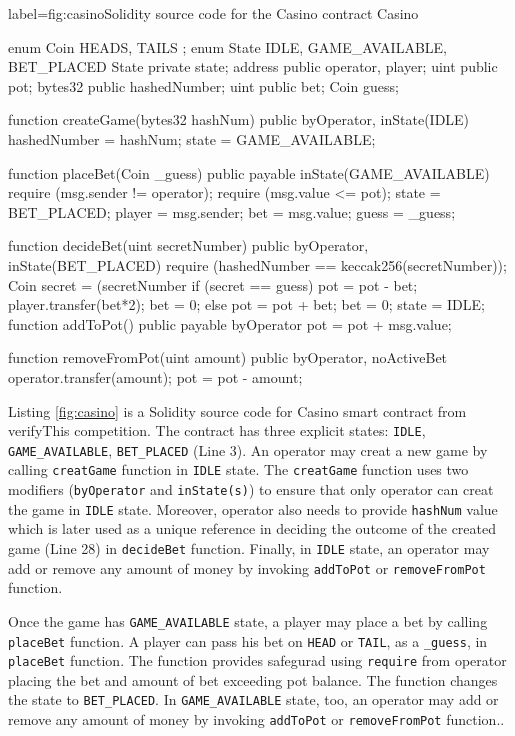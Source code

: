 \documentclass[a4paper,UKenglish,cleveref, autoref, thm-restate]{oasics-v2021}
\begin{document}
\begin{solidity}{label={fig:casino}}{Solidity source code for the Casino}
	contract Casino {
		enum Coin { HEADS, TAILS } ;
		enum State { IDLE, GAME_AVAILABLE,  BET_PLACED }
		State private state; 
		address public operator, player;
		uint public pot;
		bytes32 public hashedNumber;
		uint public bet;
		Coin guess;

		function createGame(bytes32 hashNum) 
		public byOperator, inState(IDLE) { 
		hashedNumber = hashNum; 
		state = GAME_AVAILABLE;
		}

		function placeBet(Coin _guess) public payable inState(GAME_AVAILABLE) {
		require (msg.sender != operator);
		require (msg.value <= pot);
		state = BET_PLACED; 
		player = msg.sender; 
		bet = msg.value; 
		guess = _guess; 
	}

 		function decideBet(uint secretNumber) 
		public byOperator, inState(BET_PLACED) { 
			require (hashedNumber == keccak256(secretNumber)); 
			Coin secret = (secretNumber %
			if (secret == guess) { pot = pot - bet;  player.transfer(bet*2);  bet = 0;} 
			else {
			pot = pot + bet; bet = 0;
				}
		state = IDLE;}
		function addToPot() public payable byOperator { pot = pot + msg.value;}

		function removeFromPot(uint amount) public byOperator, noActiveBet { operator.transfer(amount);  pot = pot - amount;}
		}
\end{solidity}
Listing \ref{fig:casino} is a Solidity source code for Casino smart contract from verifyThis competition. 
%
The contract has three explicit states: \texttt{IDLE}, \texttt{GAME\_AVAILABLE}, \texttt{BET\_PLACED} (Line 3).
An operator may creat a new game by calling \texttt{creatGame} function in \texttt{IDLE} state. 
%
The \texttt{creatGame} function uses two modifiers (\texttt{byOperator} and \texttt{inState(s)}) to ensure that only operator can creat the game in \texttt{IDLE} state.
%
Moreover, operator also needs to provide \texttt{hashNum} value which is later used as a unique reference in deciding the  outcome of the created game (Line 28)  in \texttt{decideBet} function. 
%
%
Finally, in \texttt{IDLE} state, an operator may add or remove any amount of money  by invoking \texttt{addToPot} or \texttt{removeFromPot} function.
%

%
Once the game has \texttt{GAME\_AVAILABLE} state,  a player may place a bet by calling \texttt{placeBet} function. 
%
A player can pass his bet on \texttt{HEAD} or \texttt{TAIL}, as a \texttt{\_guess}, in \texttt{placeBet} function. 
%
The function provides safegurad using \texttt{require} from operator placing the bet and amount of bet exceeding pot balance.
%
The function changes the state to \texttt{BET\_PLACED}. 
%
In \texttt{GAME\_AVAILABLE} state, too,  an operator may add or remove any amount of money  by invoking \texttt{addToPot} or \texttt{removeFromPot} function.. 
%
\end{document}
